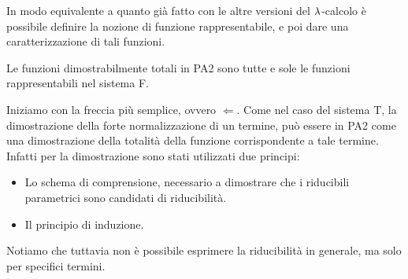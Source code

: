 \documentclass[]{marticle}
\begin{document}
In modo equivalente a quanto gi\`a fatto con le altre versioni del $\lambda$-calcolo
\`e possibile definire la nozione di funzione rappresentabile, e poi dare una
caratterizzazione di tali funzioni.

\begin{block}[Teorema]
    Le funzioni dimostrabilmente totali in PA2 sono tutte e sole le
    funzioni rappresentabili nel sistema F.
\end{block}

Iniziamo con la freccia pi\`u semplice, ovvero $\Leftarrow$. Come nel caso del
sistema T, la dimostrazione della forte normalizzazione di un termine, pu\`o
essere  in PA2 come una dimostrazione della totalit\`a della
funzione corrispondente a tale termine. Infatti per la dimostrazione sono stati
utilizzati due principi:
\begin{itemize}
    \item Lo schema di comprensione, necessario a dimostrare che i riducibili
        parametrici sono candidati di riducibilit\`a. 
    \item Il principio di induzione.
\end{itemize}
Notiamo che tuttavia non \`e possibile esprimere la riducibilit\`a in generale,
ma solo per specifici termini.
\end{document}
